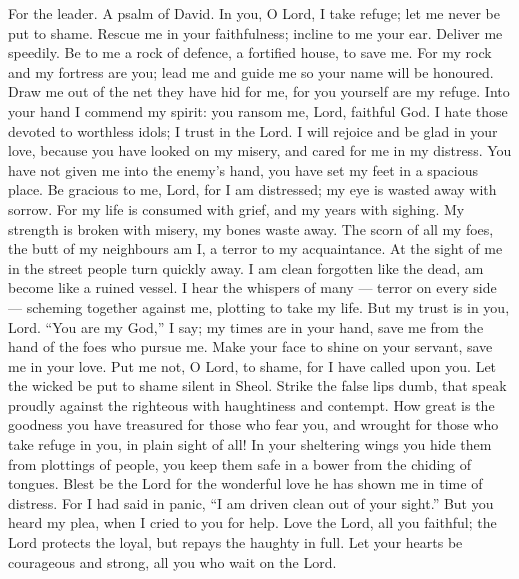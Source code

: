 For the leader. A psalm of David.  In you, O Lord, I take
refuge; let me never be put to shame. Rescue me in your faithfulness;
 incline to me your ear. Deliver me speedily. Be to me a
rock of defence, a fortified house, to save me.  For my rock
and my fortress are you; lead me and guide me so your name will be
honoured.  Draw me out of the net they have hid for me, for
you yourself are my refuge.  Into your hand I commend my
spirit: you ransom me, Lord, faithful God.  I hate those
devoted to worthless idols; I trust in the Lord.  I will
rejoice and be glad in your love, because you have looked on my misery,
and cared for me in my distress.  You have not given me into
the enemy's hand, you have set my feet in a spacious place. 
Be gracious to me, Lord, for I am distressed; my eye is wasted away with
sorrow.  For my life is consumed with grief, and my years
with sighing. My strength is broken with misery, my bones waste away.
 The scorn of all my foes, the butt of my neighbours am I,
a terror to my acquaintance. At the sight of me in the street people
turn quickly away.  I am clean forgotten like the dead, am
become like a ruined vessel.  I hear the whispers of many
--- terror on every side --- scheming together against me, plotting to
take my life.  But my trust is in you, Lord. ``You are my
God,'' I say;  my times are in your hand, save me from the
hand of the foes who pursue me.  Make your face to shine on
your servant, save me in your love.  Put me not, O Lord, to
shame, for I have called upon you. Let the wicked be put to shame silent
in Sheol.  Strike the false lips dumb, that speak proudly
against the righteous with haughtiness and contempt.  How
great is the goodness you have treasured for those who fear you, and
wrought for those who take refuge in you, in plain sight of all!
 In your sheltering wings you hide them from plottings of
people, you keep them safe in a bower from the chiding of tongues.
 Blest be the Lord for the wonderful love he has shown me
in time of distress.  For I had said in panic, ``I am
driven clean out of your sight.'' But you heard my plea, when I cried to
you for help.  Love the Lord, all you faithful; the Lord
protects the loyal, but repays the haughty in full.  Let
your hearts be courageous and strong, all you who wait on the Lord.


